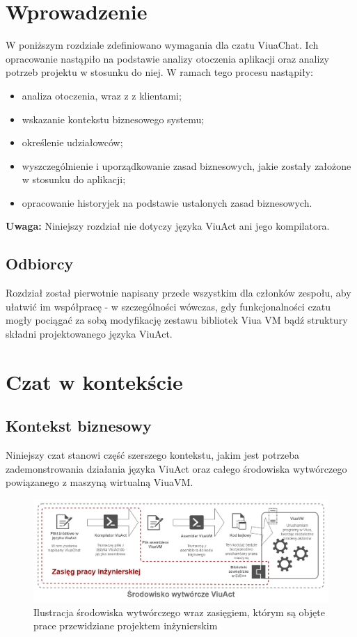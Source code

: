 \section{Wprowadzenie}

W poniższym rozdziale zdefiniowano wymagania dla czatu ViuaChat. Ich opracowanie nastąpiło na podstawie analizy otoczenia aplikacji oraz analizy potrzeb projektu w stosunku do niej. W ramach tego procesu nastąpiły:
\begin{itemize}
    \item analiza otoczenia, wraz z z klientami;
    \item wskazanie kontekstu biznesowego systemu;
    \item określenie udziałowców;
	\item wyszczególnienie i uporządkowanie zasad biznesowych, jakie zostały założone w stosunku do aplikacji;
	\item opracowanie historyjek na podstawie ustalonych zasad biznesowych.
\end{itemize}

\textbf{Uwaga:} Niniejszy rozdział nie dotyczy języka ViuAct ani jego kompilatora.

\subsection{Odbiorcy}
Rozdział został pierwotnie napisany przede wszystkim dla członków zespołu, aby ułatwić im współpracę - w szczególności wówczas, gdy funkcjonalności czatu mogły pociągać za sobą modyfikację zestawu bibliotek Viua VM bądź struktury składni projektowanego języka ViuAct.

\section{Czat w kontekście}

\subsection{Kontekst biznesowy}

Niniejszy czat stanowi część szerszego kontekstu, jakim jest potrzeba zademonstrowania działania języka ViuAct oraz całego środowiska wytwórczego powiązanego z maszyną wirtualną ViuaVM.

\begin{figure}[h]
	\centering
	\includegraphics[width=\textwidth]{chat/fig/viuavm-env}
	\caption{Ilustracja środowiska wytwórczego wraz zasięgiem, którym są objęte prace przewidziane projektem inżynierskim}
\end{figure}

